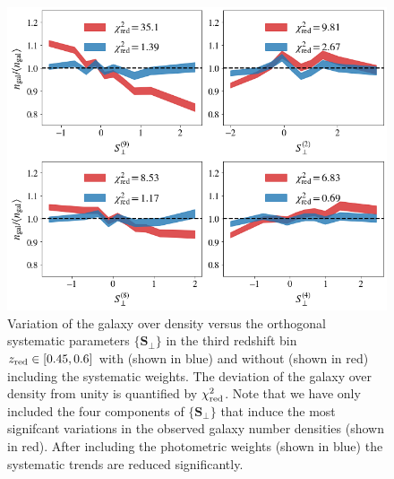 \documentclass[fleqn,usenatbib,useAMS]{mnras}
\begin{document}
\begin{figure}
    \includegraphics[width = \textwidth]{figures_tmp/weights_2.png}
    \caption{Variation of the galaxy over density versus the orthogonal systematic parameters $\{\mathbf{S}_{\perp}\}$ in the third redshift bin $z_{\rm red} \in [0.45, 0.6]$ with (shown in blue) and without (shown in red) including the systematic weights. The deviation of the galaxy over density from unity is quantified by $\chi^{2}_{\rm red}$. Note that we have only included the four components of $\{\mathbf{S}_{\perp}\}$ that induce the most signifcant variations in the observed galaxy number densities (shown in red). After including the photometric weights (shown in blue) the systematic trends are reduced significantly.}
    \label{fig:sys_ng_correlation}
\end{figure}
\end{document}
